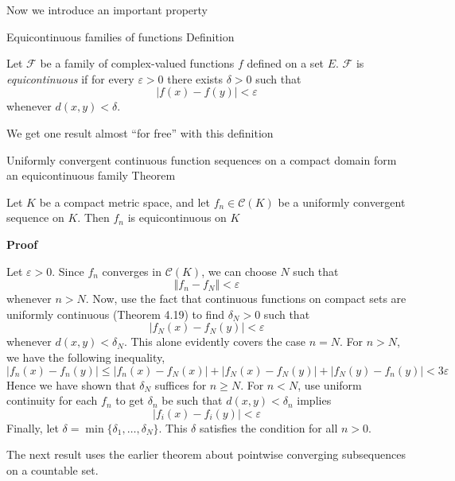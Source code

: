 Now we introduce an important property 

\begin{result}
    {Equicontinuous families of functions}
    {Definition}

    Let $\mathscr{F}$ be a family of complex-valued functions $f$ defined on a set $E$. $\mathscr{F}$ is \textit{equicontinuous} if for every $\varepsilon > 0$ there exists $\delta > 0$ such that
    \[|f(x) - f(y)| < \varepsilon\]
    whenever $d(x, y) < \delta$.
\end{result}

We get one result almost ``for free'' with this definition

\begin{result}
    {Uniformly convergent continuous function sequences on a compact domain form an equicontinuous family}
    {Theorem}

    Let $K$ be a compact metric space, and let $f_n \in \mathscr{C}(K)$ be a uniformly convergent sequence on $K$. Then $f_n$ is equicontinuous on $K$

    \textbf{Proof}

    Let $\varepsilon > 0$. Since $f_n$ converges in $\mathscr{C}(K)$, we can choose $N$ such that
    \[\Vert f_n - f_N \Vert < \varepsilon\]
    whenever $n > N$. Now, use the fact that continuous functions on compact sets are uniformly continuous (Theorem 4.19) to find $\delta_N > 0$ such that 
    \[|f_N(x) - f_N(y)| < \varepsilon\]
    whenever $d(x, y) < \delta_N$. This alone evidently covers the case $n = N$. For $n > N$, we have the following inequality,
    \[|f_n(x) - f_n(y)| \leq |f_n(x) - f_N(x)| + |f_N(x) - f_N(y)| + |f_N(y) - f_n(y)| < 3\varepsilon\]
    Hence we have shown that $\delta_N$ suffices for $n \geq N$. For $n < N$, use uniform continuity for each $f_n$ to get $\delta_n$ be such that $d(x, y) < \delta_n$ implies
    \[|f_i(x) - f_i(y)| < \varepsilon\]
    Finally, let $\delta = \min \{\delta_1, \ldots, \delta_N\}$. This $\delta$ satisfies the condition for all $n > 0$.
\end{result}

The next result uses the earlier theorem about pointwise converging subsequences on a countable set.

